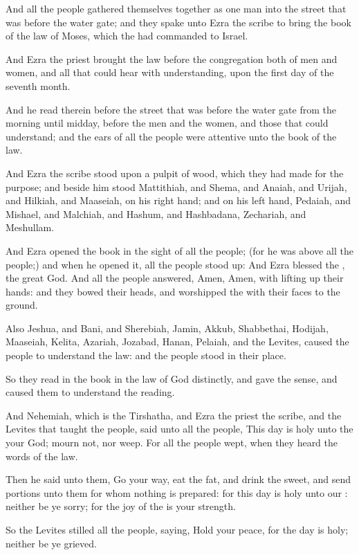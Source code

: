 \Chapter
\Verse And all the people gathered themselves together as one man into the street that was before the water gate; and they spake unto Ezra the scribe to bring the book of the law of Moses, which the \LORD had commanded to Israel.

\Verse And Ezra the priest brought the law before the congregation both of men and women, and all that could hear with understanding, upon the first day of the seventh month.

\Verse And he read therein before the street that was before the water gate from the morning until midday, before the men and the women, and those that could understand; and the ears of all the people were attentive unto the book of the law.

\Verse And Ezra the scribe stood upon a pulpit of wood, which they had made for the purpose; and beside him stood Mattithiah, and Shema, and Anaiah, and Urijah, and Hilkiah, and Maaseiah, on his right hand; and on his left hand, Pedaiah, and Mishael, and Malchiah, and Hashum, and Hashbadana, Zechariah, and Meshullam.

\Verse And Ezra opened the book in the sight of all the people; (for he was above all the people;) and when he opened it, all the people stood up: \Verse And Ezra blessed the \LORD, the great God. And all the people answered, Amen, Amen, with lifting up their hands: and they bowed their heads, and worshipped the \LORD with their faces to the ground.

\Verse Also Jeshua, and Bani, and Sherebiah, Jamin, Akkub, Shabbethai, Hodijah, Maaseiah, Kelita, Azariah, Jozabad, Hanan, Pelaiah, and the Levites, caused the people to understand the law: and the people stood in their place.

\Verse So they read in the book in the law of God distinctly, and gave the sense, and caused them to understand the reading.

\Verse And Nehemiah, which is the Tirshatha, and Ezra the priest the scribe, and the Levites that taught the people, said unto all the people, This day is holy unto the \LORD your God; mourn not, nor weep.  For all the people wept, when they heard the words of the law.

\Verse Then he said unto them, Go your way, eat the fat, and drink the sweet, and send portions unto them for whom nothing is prepared: for this day is holy unto our \LORD: neither be ye sorry; for the joy of the \LORD is your strength.

\Verse So the Levites stilled all the people, saying, Hold your peace, for the day is holy; neither be ye grieved.

